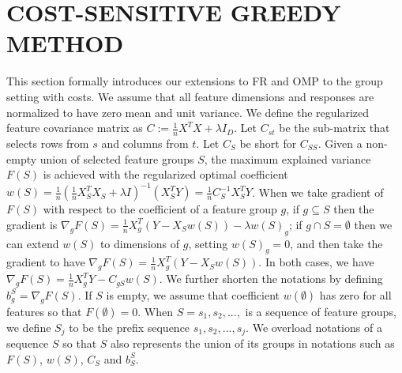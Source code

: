 \section{COST-SENSITIVE GREEDY METHOD}
\label{sec:method}

This section formally introduces our extensions to FR and OMP to 
the group setting with costs. 
We assume that all feature dimensions and responses are normalized to 
have zero mean and unit variance. 
We define the regularized feature covariance matrix as 
$C := \frac{1}{n}X^TX + \lambda I_D$. Let $C_{st}$ be the sub-matrix that selects rows from $s$ and columns from $t$. Let $C_S$ be short for $C_{SS}$. 
Given a non-empty union of selected feature groups $S$, the maximum explained variance 
$F(S)$ is achieved with the regularized optimal 
coefficient 
\mbox{$w(S) = \frac{1}{n}(\frac{1}{n}X_S^TX_S + \lambda I)^{-1}(X_S^TY) = 
    \frac{1}{n} C_S^{-1}X_S^TY$}.
When we take gradient of $F(S)$ with respect to the coefficient 
of a feature group $g$, if $g \subseteq S$ then the gradient is
\mbox{$\nabla_g F(S) = \frac{1}{n} X_g^T(Y-X_Sw(S)) - \lambda w(S)_g
$}; if 
$g \cap S  =\emptyset$ then we can extend $w(S)$ to dimensions of $g$, setting $w(S)_g = 0$, and then take the gradient to have 
\mbox{$\nabla_g F(S) =\frac{1}{n} X_g^T(Y-X_Sw(S))$}. In both cases,
we have $\nabla_g F(S) = \frac{1}{n} X_g^TY - C_{gS}w(S)$. We further shorten 
the notations by defining $b_g^{S} = \nabla _g F(S)$. 
If $S$ is empty, we assume that coefficient $w(\emptyset)$ has zero for all features so that $F(\emptyset) = 0$. 
When $S = s_1, s_2,...,$ is a sequence of feature groups, we define
$S_j$ to be the prefix sequence $s_1, s_2,..., s_j$. We 
overload notations of a sequence $S$ so that $S$ also represents 
the union of its groups in notations such as $F(S)$, $w(S)$, $C_S$ and $b_S^S$. 






